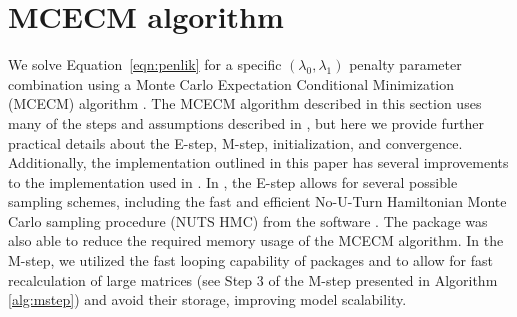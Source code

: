 \section{MCECM algorithm}
\label{sec:mcecm}

We solve Equation~\ref{eqn:penlik} for a specific $(\lambda_0,\lambda_1)$ penalty parameter combination using a Monte Carlo Expectation
Conditional Minimization (MCECM) algorithm \citep{garcia2010}. The MCECM algorithm described in this section uses many of the steps and assumptions described in \citet{rashid2020}, but here we provide further practical details about the E-step, M-step, initialization, and convergence. Additionally, the implementation outlined in this paper has several improvements to the implementation used in \citet{rashid2020}. In , the E-step allows for several possible sampling schemes, including the fast and efficient No-U-Turn Hamiltonian Monte Carlo sampling procedure (NUTS HMC) from the  software \citep{stan2017, hoffman2014NUTS}. The  package was also able to reduce the required memory usage of the MCECM algorithm. In the M-step, we utilized the fast looping capability of packages  and  to allow for fast recalculation of large matrices (see Step 3 of the M-step presented in Algorithm \ref{alg:mstep}) and avoid their storage, improving model scalability.

